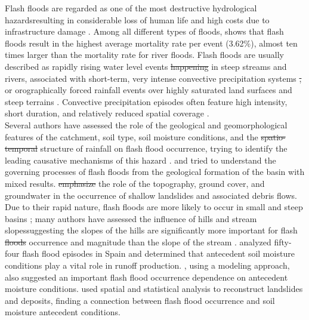 \documentclass[hess, manuscript]{copernicus}
\providecommand{\DIFadd}[1]{{\protect\color{blue}\uwave{#1}}} %
\providecommand{\DIFdel}[1]{{\protect\color{red}\sout{#1}}}                      %
\providecommand{\DIFaddbegin}{} %
\providecommand{\DIFaddend}{} %
\providecommand{\DIFdelbegin}{} %
\providecommand{\DIFdelend}{} %
\begin{document}


\introduction  %

Flash floods are regarded as one of the most destructive hydrological hazards\DIFaddbegin \DIFadd{, }\DIFaddend resulting in considerable loss of human life and high costs due to infrastructure damage  \citep{Roux2011, Gruntfest2001}.  Among all different types of floods,  \cite{Jonkman2005} shows that flash floods result in the highest average mortality rate per event (3.62\%), almost ten times larger than the mortality rate for river floods.  Flash floods are usually described as rapidly rising water level events \DIFdelbegin \DIFdel{happening }\DIFdelend \DIFaddbegin \DIFadd{occurring }\DIFaddend in steep streams and rivers, associated with short-term, very intense convective precipitation systems \DIFdelbegin \DIFdel{, }\DIFdelend or orographically forced rainfall events over highly saturated land surfaces and steep terrains \citep{Salek2006, Llasat2016, Douinot2016}. Convective precipitation episodes often feature high intensity, short duration, and relatively reduced spatial coverage \citep{HouzeMCS2004}.   \\

Several authors have assessed the role of the geological and geomorphological features of the catchment, soil type, soil moisture conditions, and the \DIFdelbegin \DIFdel{spatio-temporal }\DIFdelend \DIFaddbegin \DIFadd{spatiotemporal }\DIFaddend structure of rainfall on flash flood occurrence, trying to identify the leading causative mechanisms of this hazard \citep{Merz2003}. \citet{Adamovic2016} and \citet{Vannier2016} tried to understand the governing processes of flash floods from the geological formation of the basin with mixed results. \citet{Wu1995} \DIFdelbegin \DIFdel{emphasize }\DIFdelend \DIFaddbegin \DIFadd{emphasized }\DIFaddend the role of the topography, ground cover, and groundwater in the occurrence of shallow landslides and associated debris flows. Due to their rapid nature, flash floods are more likely to occur in small and steep basins \citep{Younis2008}; many authors have assessed the influence of hills and stream slopes\DIFaddbegin \DIFadd{, }\DIFaddend suggesting the slopes of the hills are significantly more important for flash \DIFdelbegin \DIFdel{floods }\DIFdelend \DIFaddbegin \DIFadd{flood }\DIFaddend occurrence and magnitude than the slope of the stream  \citep{Salek2006, Roux2011, Yatheendradas2008}. \citet{Rodriguez2012} analyzed fifty-four flash flood episodes in Spain and determined that antecedent soil moisture conditions play a vital role in runoff production. \citet{Castillo2003}, using a modeling approach, also suggested an important flash flood occurrence dependence on antecedent moisture conditions. \citet{Aronica2012} used spatial and statistical analysis to reconstruct landslides and deposits, finding a connection between flash flood occurrence and soil moisture antecedent conditions.\\
\end{document}
